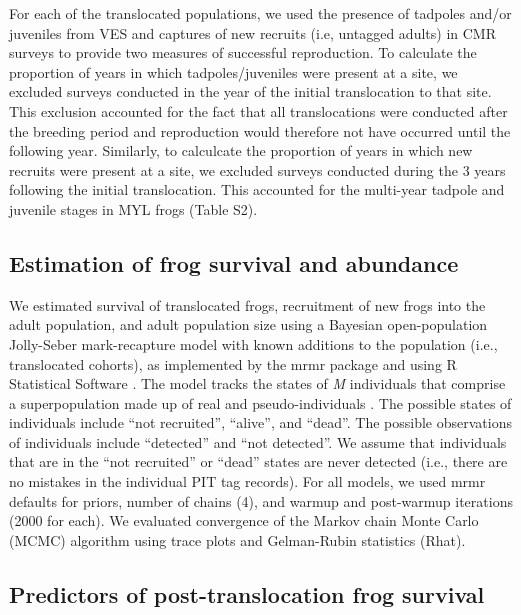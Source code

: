 \documentclass[9pt,twocolumn,twoside,lineno]{pnas-new}
\begin{document}
{For each of the translocated populations, we used the presence of
tadpoles and/or juveniles from VES and captures of new recruits (i.e,
untagged adults) in CMR surveys to provide two measures of successful
reproduction. To calculate the proportion of years in which
tadpoles/juveniles were present at a site, we excluded surveys conducted
in the year of the initial translocation to that site. This exclusion
accounted for the fact that all translocations were conducted after the
breeding period and reproduction would therefore not have occurred until
the following year. Similarly, to calculcate the proportion of years in
which new recruits were present at a site, we excluded surveys conducted
during the 3 years following the initial translocation. This accounted
for the multi-year tadpole and juvenile stages in MYL frogs
(Table S2).

\hypertarget{estimation-of-frog-survival-and-abundance}{%
\subsection*{Estimation of frog survival and
abundance}\label{estimation-of-frog-survival-and-abundance}}

We estimated survival of translocated frogs, recruitment of new frogs
into the adult population, and adult population size using a Bayesian
open-population Jolly-Seber mark-recapture model with known additions to
the population (i.e., translocated cohorts), as implemented by the mrmr
package \citep{joseph2019} and using R Statistical Software
\citep[v4.4.4,][]{rsoftware2022}. The model tracks the states of
\emph{M} individuals that comprise a superpopulation made up of real and
pseudo-individuals \citep[see][ for details]{joseph2018}. The possible
states of individuals include ``not recruited'', ``alive'', and
``dead''. The possible observations of individuals include ``detected''
and ``not detected''. We assume that individuals that are in the ``not
recruited'' or ``dead'' states are never detected (i.e., there are no
mistakes in the individual PIT tag records). For all models, we used
mrmr defaults for priors, number of chains (4), and warmup and
post-warmup iterations (2000 for each). We evaluated convergence of the
Markov chain Monte Carlo (MCMC) algorithm using trace plots and
Gelman-Rubin statistics (Rhat).

\hypertarget{predictors-of-post-translocation-frog-survival}{%
\subsection*{Predictors of post-translocation frog
survival}\label{predictors-of-post-translocation-frog-survival}}

}
\end{document}
